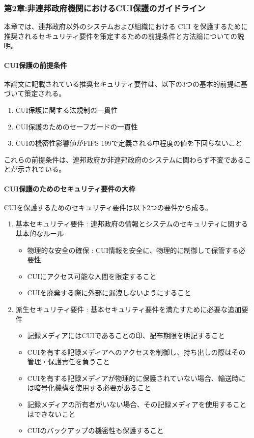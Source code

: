 \documentclass{article}[jsarticle]
\begin{document}
\subsubsection{第2章:非連邦政府機関におけるCUI保護のガイドライン}
本章では、連邦政府以外のシステムおよび組織における CUI を保護するために推奨されるセキュリティ要件を策定するための前提条件と方法論についての説明。
\paragraph{CUI保護の前提条件}
本論文に記載されている推奨セキュリティ要件は、以下の3つの基本的前提に基づいて策定される。
\begin{enumerate}
    \item CUI保護に関する法規制の一貫性
    \item CUI保護のためのセーフガードの一貫性
    \item CUIの機密性影響値がFIPS 199で定義される中程度の値を下回らないこと
\end{enumerate}
これらの前提条件は、連邦政府か非連邦政府のシステムに関わらず不変であることが示されている。

\paragraph{CUI保護のためのセキュリティ要件の大枠}
CUIを保護するためのセキュリティ要件は以下2つの要件から成る。
\begin{enumerate}
    \item 基本セキュリティ要件 : 連邦政府の情報とシステムのセキュリティに関する基本的なルール
    \begin{itemize}
        \item 物理的な安全の確保 : CUI情報を安全に、物理的に制御して保管する必要性
        \item CUIにアクセス可能な人間を限定すること
        \item CUIを廃棄する際に外部に漏洩しないようにすること
    \end{itemize}
    \item 派生セキュリティ要件 : 基本セキュリティ要件を満たすために必要な追加要件
    \begin{itemize}
        \item 記録メディアにはCUIであることの印、配布期限を明記すること
        \item CUIを有する記録メディアへのアクセスを制御し、持ち出しの際はその管理・保護責任を負うこと
        \item CUIを有する記録メディアが物理的に保護されていない場合、輸送時には暗号化機構を使用する必要があること
        \item 記録メディアの所有者がいない場合、その記録メディアを使用することはできないこと
        \item CUIのバックアップの機密性も保護すること
    \end{itemize}
\end{enumerate}
\end{document}
